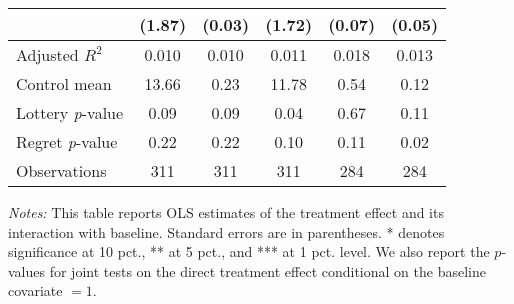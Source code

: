 \begin{table}[ht]
{\begin{threeparttable}
\begin{tabular}{l*{5}{c}}
                &   (1.87)         &   (0.03)         &   (1.72)         &   (0.07)         &   (0.05)         \\
\midrule
Adjusted \(R^{2}\)&    0.010         &    0.010         &    0.011         &    0.018         &    0.013         \\
Control mean    &    13.66         &     0.23         &    11.78         &     0.54         &     0.12         \\
Lottery \emph{p}-value&     0.09         &     0.09         &     0.04         &     0.67         &     0.11         \\
Regret \emph{p}-value&     0.22         &     0.22         &     0.10         &     0.11         &     0.02         \\
Observations    &      311         &      311         &      311         &      284         &      284         \\
\bottomrule \end{tabular} \begin{tablenotes}[flushleft] \footnotesize \item \emph{Notes:} This table reports OLS estimates of the treatment effect and its interaction with baseline. Standard errors are in parentheses. * denotes significance at 10 pct., ** at 5 pct., and *** at 1 pct. level. We also report the \(p\)-values for joint tests on the direct treatment effect conditional on the baseline covariate $= 1$. \end{tablenotes} \end{threeparttable} } \end{table}

